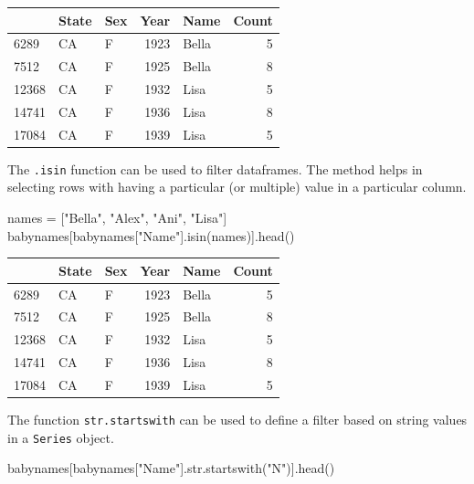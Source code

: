 \documentclass[
  letterpaper,
  DIV=11,
  numbers=noendperiod]{scrreprt}
\newenvironment{Shaded}{\begin{snugshade}}{\end{snugshade}}
\newcommand{\BuiltInTok}[1]{\textcolor[rgb]{0.00,0.23,0.31}{#1}}
\newcommand{\NormalTok}[1]{\textcolor[rgb]{0.00,0.23,0.31}{#1}}
\newcommand{\OperatorTok}[1]{\textcolor[rgb]{0.37,0.37,0.37}{#1}}
\newcommand{\StringTok}[1]{\textcolor[rgb]{0.13,0.47,0.30}{#1}}
\begin{document}
\begin{tabular}{lllrlr}
\toprule
{} & State & Sex &  Year &   Name &  Count \\
\midrule
6289  &    CA &   F &  1923 &  Bella &      5 \\
7512  &    CA &   F &  1925 &  Bella &      8 \\
12368 &    CA &   F &  1932 &   Lisa &      5 \\
14741 &    CA &   F &  1936 &   Lisa &      8 \\
17084 &    CA &   F &  1939 &   Lisa &      5 \\
\bottomrule
\end{tabular}

The \texttt{.isin} function can be used to filter dataframes. The method
helps in selecting rows with having a particular (or multiple) value in
a particular column.

\begin{Shaded}
\begin{Highlighting}[]
\NormalTok{names }\OperatorTok{=}\NormalTok{ [}\StringTok{"Bella"}\NormalTok{, }\StringTok{"Alex"}\NormalTok{, }\StringTok{"Ani"}\NormalTok{, }\StringTok{"Lisa"}\NormalTok{]}
\NormalTok{babynames[babynames[}\StringTok{"Name"}\NormalTok{].isin(names)].head()}
\end{Highlighting}
\end{Shaded}

\begin{tabular}{lllrlr}
\toprule
{} & State & Sex &  Year &   Name &  Count \\
\midrule
6289  &    CA &   F &  1923 &  Bella &      5 \\
7512  &    CA &   F &  1925 &  Bella &      8 \\
12368 &    CA &   F &  1932 &   Lisa &      5 \\
14741 &    CA &   F &  1936 &   Lisa &      8 \\
17084 &    CA &   F &  1939 &   Lisa &      5 \\
\bottomrule
\end{tabular}

The function \texttt{str.startswith} can be used to define a filter
based on string values in a \texttt{Series} object.

\begin{Shaded}
\begin{Highlighting}[]
\NormalTok{babynames[babynames[}\StringTok{"Name"}\NormalTok{].}\BuiltInTok{str}\NormalTok{.startswith(}\StringTok{"N"}\NormalTok{)].head()}
\end{Highlighting}
\end{Shaded}
\end{document}
